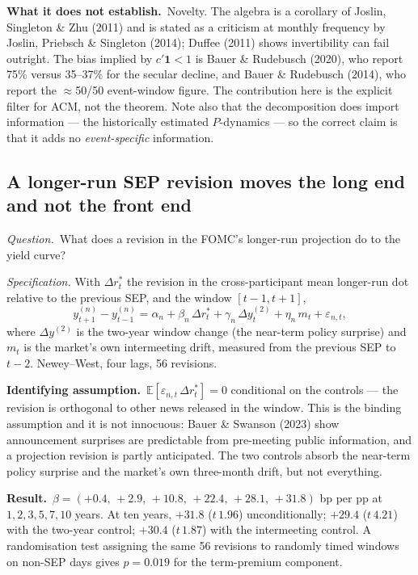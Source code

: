 \documentclass[11pt]{article}
\newcommand{\qq}[1]{\vspace{0.3em}\noindent\textit{Question.}\ #1}
\newcommand{\ia}[1]{\vspace{0.4em}\noindent\textbf{Identifying assumption.}\ #1}
\newcommand{\res}[1]{\vspace{0.4em}\noindent\textbf{Result.}\ #1}
\newcommand{\limn}[1]{\vspace{0.4em}\noindent\textbf{What it does not establish.}\ #1}
\begin{document}
\limn{Novelty. The algebra is a corollary of Joslin, Singleton \& Zhu (2011) and is stated as a criticism at monthly frequency by Joslin, Priebsch \& Singleton (2014); Duffee (2011) shows invertibility can fail outright. The bias implied by $c'\boldsymbol 1<1$ is Bauer \& Rudebusch (2020), who report 75\% versus 35--37\% for the secular decline, and Bauer \& Rudebusch (2014), who report the $\approx$50/50 event-window figure. The contribution here is the explicit filter for ACM, not the theorem. Note also that the decomposition does import information --- the historically estimated $P$-dynamics --- so the correct claim is that it adds no \emph{event-specific} information.}

\subsection{A longer-run SEP revision moves the long end and not the front end}

\qq{What does a revision in the FOMC's longer-run projection do to the yield curve?}

\vspace{0.4em}\noindent\textit{Specification.} With $\Delta r^*_t$ the revision in the cross-participant mean longer-run dot relative to the previous SEP, and the window $[t-1,t+1]$,
\begin{equation}
y^{(n)}_{t+1}-y^{(n)}_{t-1}=\alpha_n+\beta_n\,\Delta r^*_t+\gamma_n\,\Delta y^{(2)}_t+\eta_n\,m_t+\varepsilon_{n,t},
\end{equation}
where $\Delta y^{(2)}$ is the two-year window change (the near-term policy surprise) and $m_t$ is the market's own intermeeting drift, measured from the previous SEP to $t-2$. Newey--West, four lags, 56 revisions.

\ia{$\mathbb E[\varepsilon_{n,t}\,\Delta r^*_t]=0$ conditional on the controls --- the revision is orthogonal to other news released in the window. This is the binding assumption and it is not innocuous: Bauer \& Swanson (2023) show announcement surprises are predictable from pre-meeting public information, and a projection revision is partly anticipated. The two controls absorb the near-term policy surprise and the market's own three-month drift, but not everything.}

\res{$\beta=(+0.4,\,+2.9,\,+10.8,\,+22.4,\,+28.1,\,+31.8)$ bp per pp at $1,2,3,5,7,10$ years. At ten years, $+31.8$ ($t\,1.96$) unconditionally; $+29.4$ ($t\,4.21$) with the two-year control; $+30.4$ ($t\,1.87$) with the intermeeting control. A randomisation test assigning the same 56 revisions to randomly timed windows on non-SEP days gives $p=0.019$ for the term-premium component.}
\end{document}
